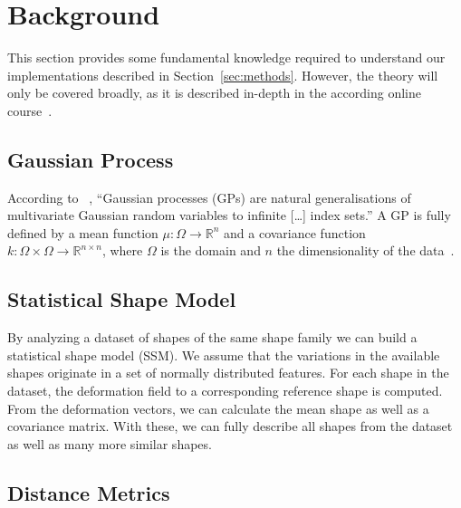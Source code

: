 \section{Background}
\label{sec:background}

This section provides some fundamental knowledge required to understand our implementations described in Section~\ref{sec:methods}.
However, the theory will only be covered broadly, as it is described in-depth in the according online course~\citep{mooc2019statistical}.


\subsection{Gaussian Process}
\label{subsec:gp}

According to \citeauthor{seeger2004gaussian}~\cite{seeger2004gaussian}, ``Gaussian processes (GPs) are natural generalisations of multivariate Gaussian random variables to infinite [\dots] index sets.''
A GP is fully defined by a mean function $ \mu : \Omega \rightarrow \mathbb{R}^n $ and a covariance function $k : \Omega \times \Omega \rightarrow \mathbb{R}^{n \times n} $, where $\Omega$ is the domain and $n$ the dimensionality of the data~\citep{mooc2019statistical}.



\subsection{Statistical Shape Model}
\label{subsec:ssm}

By analyzing a dataset of shapes of the same shape family we can build a statistical shape model (SSM).
We assume that the variations in the available shapes originate in a set of normally distributed features.
For each shape in the dataset, the deformation field to a corresponding reference shape is computed.
From the deformation vectors, we can calculate the mean shape as well as a covariance matrix.
With these, we can fully describe all shapes from the dataset as well as many more similar shapes.


\subsection{Distance Metrics}
\label{subsec:metrics}

